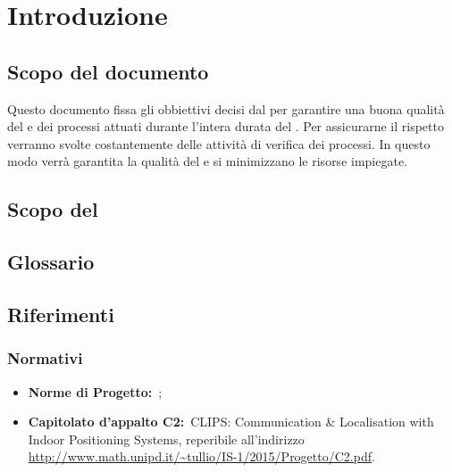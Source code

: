 
\section{Introduzione}
\label{introduzione}
	\subsection{Scopo del documento}
	\label{scopoDelDocumento}
	Questo documento fissa gli obbiettivi decisi dal  per garantire una buona qualità del  e dei processi attuati durante l'intera durata del . Per assicurarne il rispetto verranno svolte costantemente delle attività di verifica dei processi. In questo modo verrà garantita la qualità del  e si minimizzano le risorse impiegate.
	
	\subsection{Scopo del }
	\label{scopoDelProdotto}
	\SCOPO
	
	\subsection{Glossario}
	\label{glossario}
	\GLOSSARIO
	
	\subsection{Riferimenti}
	\label{riferimenti}
		\subsubsection{Normativi}
		\label{normativi}
			\begin{itemize}
				\item \textbf{Norme di Progetto:}\ \NPdoc;
				\item \textbf{Capitolato d'appalto C2:}\ CLIPS: Communication \& Localisation with Indoor Positioning Systems, reperibile all'indirizzo \url{http://www.math.unipd.it/~tullio/IS-1/2015/Progetto/C2.pdf}.
			\end{itemize}
	
